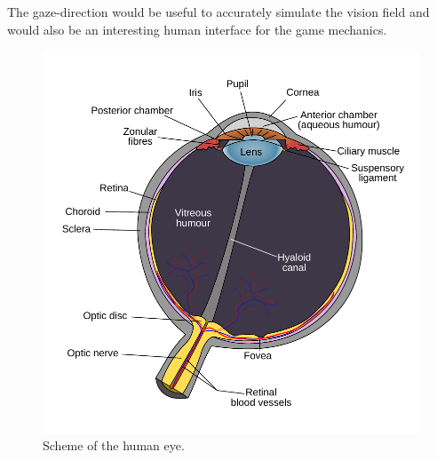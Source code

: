 \documentclass{acm_proc_article-sp}
\begin{document}
The gaze-direction would be useful to accurately simulate the vision field
and would also be an interesting human interface for the game mechanics.

\begin{figure}
    \centering
    \includegraphics[width=\columnwidth]{human_eye_scheme.pdf}
    \caption{Scheme of the human eye.}
    \label{humaneye}
\end{figure}
\end{document}
